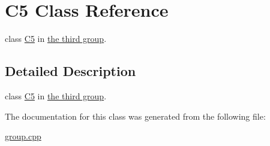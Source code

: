 \hypertarget{classC5}{\section{C5 Class Reference}
\label{classC5}
}


class \hyperlink{classC5}{C5} in \hyperlink{group__group3}{the third group}.  




\subsection{Detailed Description}
class \hyperlink{classC5}{C5} in \hyperlink{group__group3}{the third group}. 

The documentation for this class was generated from the following file\-:\begin{DoxyCompactItemize}
\item 
\hyperlink{group_8cpp}{group.\-cpp}\end{DoxyCompactItemize}
